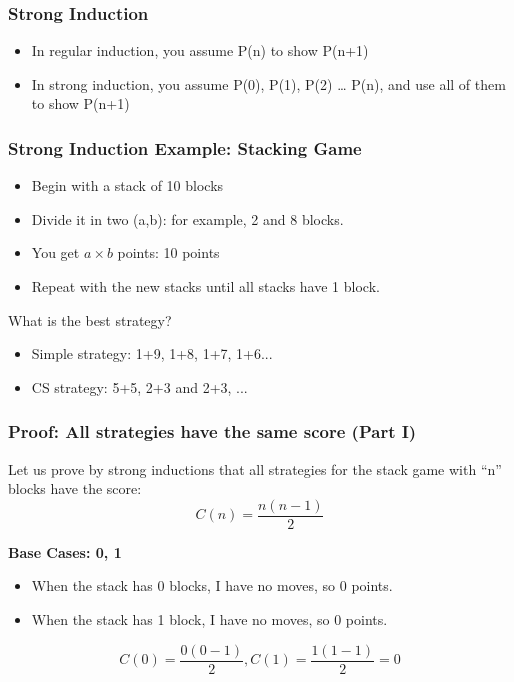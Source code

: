 \documentclass{beamer}
\begin{document}
\begin{frame}
  \frametitle{Strong Induction}

  {\larger
    \begin{itemize}
    \item In regular induction, you assume P(n) to show P(n+1)
      
      \bigskip
      
    \item In strong induction, you assume P(0), P(1), P(2) \ldots
      P(n), and use all of them to show P(n+1)
    \end{itemize}
  }
\end{frame}

\begin{frame}
  \frametitle{Strong Induction Example: Stacking Game}
  {\larger
  \begin{itemize}
  \item Begin with a stack of 10 blocks
  \item Divide it in two (a,b): for example, 2 and 8 blocks.
  \item You get $a\times b$ points: 10 points
  \item Repeat with the new stacks until all stacks have 1 block.
  \end{itemize}

  \bigskip
  
  \alert{What is the best strategy?}
  \begin{itemize}
  \item Simple strategy: 1+9, 1+8, 1+7, 1+6... 
  \item CS strategy: 5+5, 2+3 and 2+3, ...     
  \end{itemize}
  }
\end{frame}

\begin{frame}
  \frametitle{Proof: All strategies have the same score (Part I)}

  {\larger
  Let us prove by strong inductions that all strategies for the stack
  game with ``n'' blocks have the score:
  \begin{equation*}
    C(n) = \frac{n(n-1)}{2}
  \end{equation*}

  \bigskip

  {\bf Base Cases: 0, 1}
  \begin{itemize}
  \item When the stack has 0 blocks, I have no moves, so 0 points.
  \item When the stack has 1 block, I have no moves, so 0 points.
  \end{itemize}
  \begin{equation*}
    C(0) = \frac{0(0-1)}{2}, C(1) = \frac{1(1-1)}{2} = 0
  \end{equation*}
  }
\end{frame}
\end{document}
